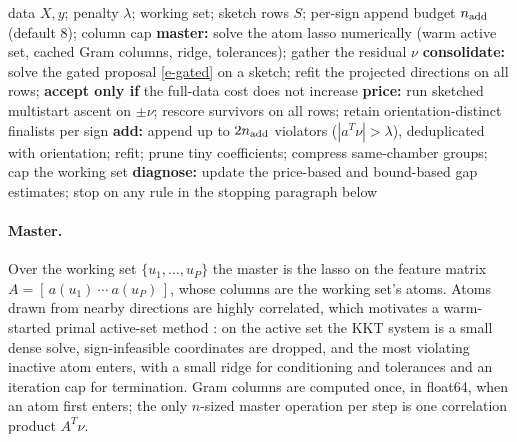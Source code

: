 \documentclass[12pt]{article}
\theoremstyle{plain}
\theoremstyle{definition}
\begin{document}
\begin{algorithm}[tb]
\caption{Production RCG (one round)}\label{alg-production}
\begin{algorithmic}[1]
\Require data $X,y$; penalty $\lambda$; working set; sketch rows $S$;
  per-sign append budget $n_{\rm add}$ (default $8$); column cap
\State \textbf{master:} solve the atom lasso numerically (warm active set,
  cached Gram columns, ridge, tolerances); gather the residual $\nu$
\State \textbf{consolidate:} solve the gated proposal \eqref{e-gated} on a
  sketch; refit the projected directions on all rows; \textbf{accept only if}
  the full-data cost does not increase
\State \textbf{price:} run sketched multistart ascent on $\pm\nu$; rescore
  survivors on all rows; retain orientation-distinct finalists per sign
\State \textbf{add:} append up to $2n_{\rm add}$ violators
  ($|a^T\nu|>\lambda$), deduplicated with orientation; refit; prune tiny
  coefficients; compress same-chamber groups; cap the working set
\State \textbf{diagnose:} update the price-based and bound-based gap
  estimates; stop on any rule in the stopping paragraph below
\end{algorithmic}
\end{algorithm}

\paragraph{Master.}
Over the working set $\{u_1,\ldots,u_P\}$ the master is the lasso on the
feature matrix $A=[\,a(u_1)\ \cdots\ a(u_P)\,]$, whose columns are the
working set's atoms. Atoms drawn from nearby
directions are highly correlated, which motivates a warm-started primal
active-set method \citep{osborne2000new}: on the active set the KKT system is
a small dense solve, sign-infeasible coordinates are dropped, and the most
violating inactive atom enters, with a small ridge for conditioning and
tolerances and an iteration cap for termination. Gram columns are computed
once, in float64, when an atom first enters; the only $n$-sized master
operation per step is one correlation product $A^T\nu$.
\end{document}
